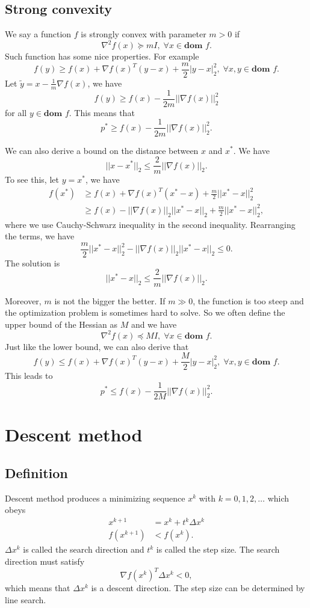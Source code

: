 \documentclass[lang=en,color=blue,mode=fancy,titlestyle=hang]{elegantbook}
\begin{document}
\subsection{Strong convexity}
We say a function $f$ is strongly convex with parameter $m > 0$ if
\[
\nabla^2 f(x) \succeq m I, \; \forall x \in \textbf{dom } f.
\]
Such function has some nice properties. For example
\[
f(y) \geq f(x) + \nabla f(x)^T (y - x) + \frac{m}{2} |y - x|_2^2, \; \forall x, y \in \textbf{dom } f.
\]
Let $\tilde{y} = x- \frac{1}{m} \nabla f(x)$, we have
\[
f(y) \geq f(x) - \frac{1}{2m} ||\nabla f(x)||_2^2
\]
for all $y \in \textbf{dom } f$. This means that
\[
p^* \geq f(x) - \frac{1}{2m} ||\nabla f(x)||_2^2.
\]

We can also derive a bound on the distance between $x$ and $x^*$. We have
\[
||x - x^*||_2 \leq \frac{2}{m} ||\nabla f(x)||_2.
\]
To see this, let $y=x^*$, we have
\begin{align*}
  f(x^*) &\geq f(x) + \nabla f(x)^T (x^* - x) + \frac{m}{2} ||x^* - x||_2^2\\
  &\geq f(x) - ||\nabla f(x)||_2 ||x^* - x||_2 + \frac{m}{2} ||x^* - x||_2^2,
\end{align*}
where we use Cauchy-Schwarz inequality in the second inequality. Rearranging the terms, we have
\[
\frac{m}{2} ||x^* - x||_2^2 - ||\nabla f(x)||_2 ||x^* - x||_2 \leq 0.
\]
The solution is
\[
||x^* - x||_2 \leq \frac{2}{m} ||\nabla f(x)||_2.
\]

Moreover, $m$ is not the bigger the better. If $m \gg 0$, the function is too steep and the optimization
problem is sometimes hard to solve. So we often define the upper bound of the Hessian as $M$
and we have
\[
\nabla^2 f(x) \preceq M I, \; \forall x \in \textbf{dom } f.
\]
Just like the lower bound, we can also derive that
\[
f(y) \leq f(x) + \nabla f(x)^T (y - x) + \frac{M}{2} |y - x|_2^2, \; \forall x, y \in \textbf{dom } f.
\]
This leads to
\[
p^* \leq f(x) - \frac{1}{2M} ||\nabla f(x)||_2^2.
\]

\section{Descent method}
\subsection{Definition}
Descent method produces a minimizing sequence $x^k$ with $k = 0, 1, 2, \ldots$ which obeys
\begin{align*}
x^{k+1} &= x^k + t^k \Delta x^k\\
f(x^{k+1}) &< f(x^k).
\end{align*}
$\Delta x^k$ is called the search direction and $t^k$ is called the step size. The search direction
must satisfy
\[
\nabla f(x^k)^T \Delta x^k < 0,
\]
which means that $\Delta x^k$ is a descent direction. The step size can be determined by line search.
\end{document}
